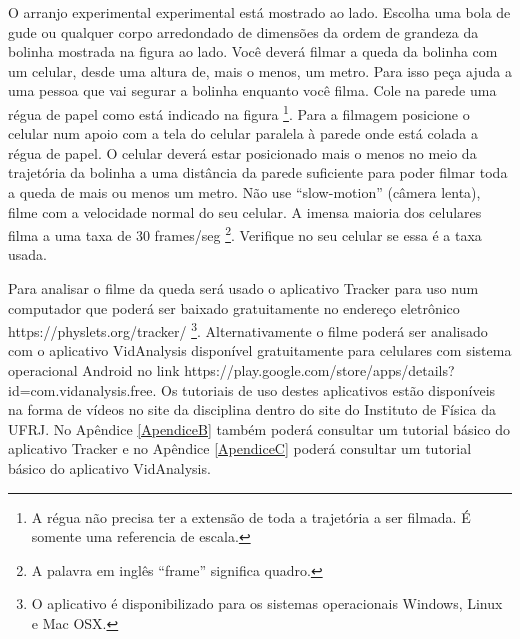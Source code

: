 \documentclass[12pt]{article}
\begin{document}
\begin{minipage}[c]{11.5cm}

\hskip 0.5cm
O arranjo experimental experimental está mostrado ao lado. Escolha uma bola de gude ou qualquer corpo arredondado de dimensões da ordem de grandeza da bolinha mostrada na figura ao lado. Você deverá filmar a queda da bolinha com um celular, desde uma altura de, mais o menos, um metro. Para isso peça ajuda a uma pessoa que vai segurar a bolinha enquanto você filma.  Cole na parede uma régua de papel como está indicado na figura \footnote{A régua não precisa ter a extensão de toda a trajetória a ser filmada. É somente uma referencia de escala.}. Para a filmagem posicione o celular num apoio com a tela do celular paralela à parede onde está colada a régua de papel. O celular deverá estar posicionado mais o menos no meio da trajetória da bolinha a uma distância da parede suficiente para poder filmar toda a queda de mais ou menos um metro. Não use ``slow-motion'' (câmera lenta),  filme com a velocidade normal do seu celular. A imensa maioria dos celulares filma a uma taxa de 30 frames/seg \footnote{A palavra em inglês ``frame'' significa quadro.}. Verifique no seu celular se essa é a taxa usada.
\par
\hskip 0.5cm
Para analisar o filme da queda será usado o aplicativo Tracker para uso num computador 
que poderá ser baixado gratuitamente no endereço eletrônico {\color{blue} https://physlets.org/tracker/
}\footnote{O aplicativo é disponibilizado para os sistemas operacionais Windows, Linux e Mac OSX.}. Alternativamente o filme poderá ser analisado com o aplicativo VidAnalysis disponível gratuitamente para celulares com sistema operacional Android no link  {\color{blue} https://play.google.com/store/apps/details?id=com.vidanalysis.free}. 
Os tutoriais de uso destes aplicativos estão disponíveis na forma de vídeos no site da disciplina dentro do site do Instituto de Física da UFRJ. No Apêndice \ref{ApendiceB} também poderá consultar um tutorial básico do aplicativo Tracker e no Apêndice \ref{ApendiceC}  poderá consultar um tutorial básico do aplicativo VidAnalysis.
\end{minipage}
\hskip 0.2cm
\end{document}
